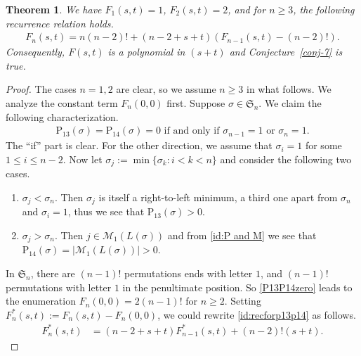 \documentclass[12pt,reqno]{article}
\numberwithin{equation}{section}
\theoremstyle{plain}
\newtheorem{theorem}{Theorem}[section]
\theoremstyle{definition}
\def\fS{\mathfrak{S}}
\def\rP{\mathrm{P}}
\def\cN{\mathcal{M}}
\begin{document}
\begin{theorem}\label{recforp13p14}
We have $F_1(s,t)=1$, $F_2(s,t)=2$, and for $n \ge 3$, the following recurrence relation holds.
\begin{align}\label{id:recforp13p14}
	F_n(s,t)=n(n-2)!+(n-2+s+t)(F_{n-1}(s,t)-(n-2)!).
\end{align}
Consequently, $F(s,t)$ is a polynomial in $(s+t)$ and Conjecture~\ref{conj-7} is true.
\end{theorem}
\begin{proof}
The cases $n=1,2$ are clear, so we assume $n\ge 3$ in what follows. We analyze the constant term $F_n(0,0)$ first. Suppose $\sigma\in\fS_n$. We claim the following characterization.
\begin{align}\label{P13P14zero}
\rP_{13}(\sigma)=\rP_{14}(\sigma)=0 \text{ if and only if $\sigma_{n-1}=1$ or $\sigma_n=1$.}
\end{align}
The ``if'' part is clear. For the other direction, we assume that $\sigma_i=1$ for some $1\le i\le n-2$. Now let $\sigma_j:=\min\{\sigma_k: i<k<n\}$ and consider the following two cases.
\begin{enumerate}
	\item $\sigma_j<\sigma_n$. Then $\sigma_j$ is itself a right-to-left minimum, a third one apart from $\sigma_n$ and $\sigma_i=1$, thus we see that $\rP_{13}(\sigma)>0$.
	\item $\sigma_j>\sigma_n$. Then $j\in\cN_1(L(\sigma))$ and from \eqref{id:P and M} we see that $\rP_{14}(\sigma)=|\cN_1(L(\sigma))|>0$.
\end{enumerate}

In $\fS_n$, there are $(n-1)!$ permutations ends with letter $1$, and $(n-1)!$ permutations with letter $1$ in the penultimate position. So \eqref{P13P14zero} leads to the enumeration $F_n(0,0)=2(n-1)!$ for $n\ge 2$. Setting $F_n^*(s,t):=F_n(s,t)-F_n(0,0)$, we could rewrite \eqref{id:recforp13p14} as follows.
\begin{align}\label{id:recF*}
F_n^*(s,t) &= (n-2+s+t)F_{n-1}^*(s,t)+(n-2)!(s+t).
\end{align}


\end{proof}
\end{document}
